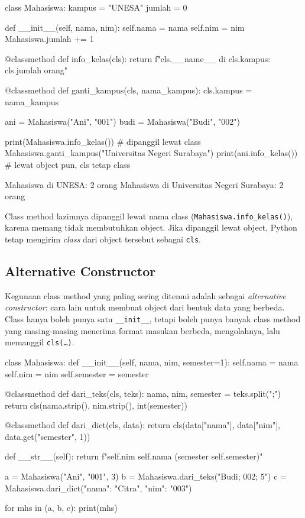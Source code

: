 \begin{kode}
class Mahasiswa:
    kampus = "UNESA"
    jumlah = 0

    def __init__(self, nama, nim):
        self.nama = nama
        self.nim = nim
        Mahasiswa.jumlah += 1

    @classmethod
    def info_kelas(cls):
        return f"{cls.__name__} di {cls.kampus}: {cls.jumlah} orang"

    @classmethod
    def ganti_kampus(cls, nama_kampus):
        cls.kampus = nama_kampus

ani = Mahasiswa("Ani", "001")
budi = Mahasiswa("Budi", "002")

print(Mahasiswa.info_kelas())          # dipanggil lewat class
Mahasiswa.ganti_kampus("Universitas Negeri Surabaya")
print(ani.info_kelas())                # lewat object pun, cls tetap class
\end{kode}

\begin{keluaran}
Mahasiswa di UNESA: 2 orang
Mahasiswa di Universitas Negeri Surabaya: 2 orang
\end{keluaran}

Class method lazimnya dipanggil lewat nama class (\texttt{Mahasiswa.info\_kelas()}), karena memang tidak membutuhkan object. Jika dipanggil lewat object, Python tetap mengirim \emph{class} dari object tersebut sebagai \texttt{cls}.

\subsection{Alternative Constructor}

Kegunaan class method yang paling sering ditemui adalah sebagai \emph{alternative constructor}: cara lain untuk membuat object dari bentuk data yang berbeda. Class hanya boleh punya satu \texttt{\_\_init\_\_}, tetapi boleh punya banyak class method yang masing-masing menerima format masukan berbeda, mengolahnya, lalu memanggil \texttt{cls(\ldots)}.

\begin{kode}
class Mahasiswa:
    def __init__(self, nama, nim, semester=1):
        self.nama = nama
        self.nim = nim
        self.semester = semester

    @classmethod
    def dari_teks(cls, teks):
        nama, nim, semester = teks.split(";")
        return cls(nama.strip(), nim.strip(), int(semester))

    @classmethod
    def dari_dict(cls, data):
        return cls(data["nama"], data["nim"], data.get("semester", 1))

    def __str__(self):
        return f"{self.nim} {self.nama} (semester {self.semester})"

a = Mahasiswa("Ani", "001", 3)
b = Mahasiswa.dari_teks("Budi; 002; 5")
c = Mahasiswa.dari_dict({"nama": "Citra", "nim": "003"})

for mhs in (a, b, c):
    print(mhs)
\end{kode}

